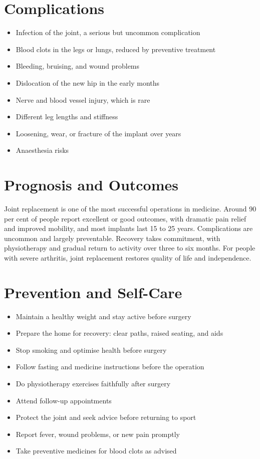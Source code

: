 \section*{Complications}
\begin{itemize}
    \item Infection of the joint, a serious but uncommon complication
    \item Blood clots in the legs or lungs, reduced by preventive treatment
    \item Bleeding, bruising, and wound problems
    \item Dislocation of the new hip in the early months
    \item Nerve and blood vessel injury, which is rare
    \item Different leg lengths and stiffness
    \item Loosening, wear, or fracture of the implant over years
    \item Anaesthesia risks
\end{itemize}

\section*{Prognosis and Outcomes}
Joint replacement is one of the most successful operations in medicine. Around 90 per cent of people report excellent or good outcomes, with dramatic pain relief and improved mobility, and most implants last 15 to 25 years. Complications are uncommon and largely preventable. Recovery takes commitment, with physiotherapy and gradual return to activity over three to six months. For people with severe arthritis, joint replacement restores quality of life and independence.

\section*{Prevention and Self-Care}
\begin{itemize}
    \item Maintain a healthy weight and stay active before surgery
    \item Prepare the home for recovery: clear paths, raised seating, and aids
    \item Stop smoking and optimise health before surgery
    \item Follow fasting and medicine instructions before the operation
    \item Do physiotherapy exercises faithfully after surgery
    \item Attend follow-up appointments
    \item Protect the joint and seek advice before returning to sport
    \item Report fever, wound problems, or new pain promptly
    \item Take preventive medicines for blood clots as advised
\end{itemize}

